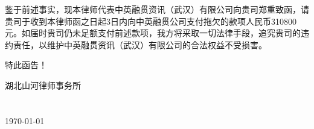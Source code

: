 \documentclass[fontset=none,zihao=-4]{ctexart}
\begin{document}
鉴于前述事实，现本律师代表中英融贯资讯（武汉）有限公司向贵司郑重致函，请贵司于收到本律师函之日起3日内向中英融贯公司支付拖欠的款项人民币310800元。如届时贵司仍未足额支付前述款项，我方将采取一切法律手段，追究贵司的违约责任，以维护中英融贯资讯（武汉）有限公司的合法权益不受损害。

\vspace{3ex}
特此函告！
\vspace{5ex}


\begin{flushright}
湖北山河律师事务所\\
\hfill{}\\
\hfill\makebox[4em][r]{}\\
\today
\end{flushright}
\end{document}

